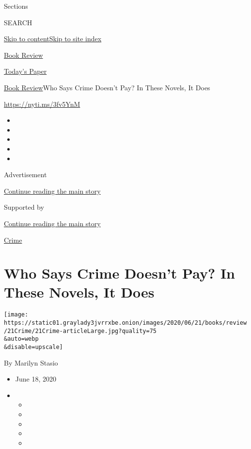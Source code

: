 Sections

SEARCH

\protect\hyperlink{site-content}{Skip to
content}\protect\hyperlink{site-index}{Skip to site index}

\href{https://www.nytimes3xbfgragh.onion/section/books/review}{Book
Review}

\href{https://myaccount.nytimes3xbfgragh.onion/auth/login?response_type=cookie\&client_id=vi}{}

\href{https://www.nytimes3xbfgragh.onion/section/todayspaper}{Today's
Paper}

\href{/section/books/review}{Book Review}\textbar{}Who Says Crime
Doesn't Pay? In These Novels, It Does

\url{https://nyti.ms/3fv5YnM}

\begin{itemize}
\item
\item
\item
\item
\item
\end{itemize}

Advertisement

\protect\hyperlink{after-top}{Continue reading the main story}

Supported by

\protect\hyperlink{after-sponsor}{Continue reading the main story}

\href{/column/crime}{Crime}

\hypertarget{who-says-crime-doesnt-pay-in-these-novels-it-does}{%
\section{Who Says Crime Doesn't Pay? In These Novels, It
Does}\label{who-says-crime-doesnt-pay-in-these-novels-it-does}}

\texttt{[image: https://static01.graylady3jvrrxbe.onion/images/2020/06/21/books/review/21Crime/21Crime-articleLarge.jpg?quality=75\\\&auto=webp\\\&disable=upscale]}

By Marilyn Stasio

\begin{itemize}
\item
  June 18, 2020
\item
  \begin{itemize}
  \item
  \item
  \item
  \item
  \item
  \end{itemize}
\end{itemize}

